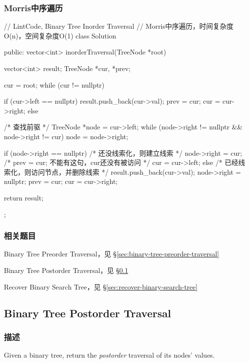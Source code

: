 \subsubsection{Morris中序遍历}
\begin{Code}
// LintCode, Binary Tree Inorder Traversal
// Morris中序遍历，时间复杂度O(n)，空间复杂度O(1)
class Solution {
public:
    vector<int> inorderTraversal(TreeNode *root) {
        vector<int> result;
        TreeNode *cur, *prev;

        cur = root;
        while (cur != nullptr) {
            if (cur->left == nullptr) {
                result.push_back(cur->val);
                prev = cur;
                cur = cur->right;
            } else {
                /* 查找前驱 */
                TreeNode *node = cur->left;
                while (node->right != nullptr && node->right != cur)
                    node = node->right;

                if (node->right == nullptr) { /* 还没线索化，则建立线索 */
                    node->right = cur;
                    /* prev = cur; 不能有这句，cur还没有被访问 */
                    cur = cur->left;
                } else {    /* 已经线索化，则访问节点，并删除线索  */
                    result.push_back(cur->val);
                    node->right = nullptr;
                    prev = cur;
                    cur = cur->right;
                }
            }
        }
        return result;
    }
};
\end{Code}


\subsubsection{相关题目}
\begindot
\item Binary Tree Preorder Traversal，见 \S \ref{sec:binary-tree-preorder-traversal}
\item Binary Tree Postorder Traversal，见 \S \ref{sec:binary-tree-postorder-traversal}
\item Recover Binary Search Tree，见 \S \ref{sec:recover-binary-search-tree}
\myenddot


\subsection{Binary Tree Postorder Traversal}
\label{sec:binary-tree-postorder-traversal}


\subsubsection{描述}
Given a binary tree, return the \emph{postorder} traversal of its nodes' values.

